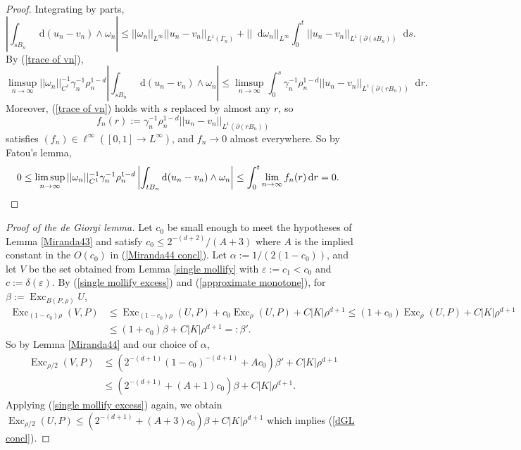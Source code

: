 \documentclass[reqno,10pt]{amsart}
\DeclareMathOperator{\Exc}{Exc}
\newcommand*\dif{\mathop{}\!\mathrm{d}}
\theoremstyle{definition}
\numberwithin{equation}{section}
\begin{document}
\begin{proof}
Integrating by parts,
$$\left|\int_{sB_n} \dif (u_n - v_n) \wedge \omega_n\right| \leq ||\omega_n||_{L^\infty} ||u_n - v_n||_{L^1(\Gamma_n)} + ||\dif \omega_n||_{L^\infty} \int_0^t ||u_n - v_n||_{L^1(\partial(sB_n))} \dif s.$$
By (\ref{trace of vn}),
$$\limsup_{n \to \infty} ||\omega_n||_{C^1}^{-1} \gamma_n^{-1} \rho_n^{1 - d} \left|\int_{sB_n} \dif(u_n - v_n) \wedge \omega_n\right| \leq \limsup_{n \to \infty} \int_0^s \gamma_n^{-1} \rho_n^{1 - d} ||u_n - v_n||_{L^1(\partial(rB_n))} \dif r.$$
Moreover, (\ref{trace of vn}) holds with $s$ replaced by almost any $r$, so
$$f_n(r) := \gamma_n^{-1} \rho_n^{1 - d} ||u_n - v_n||_{L^1(\partial(rB_n))}$$
satisfies $(f_n) \in \ell^\infty([0, 1] \to L^\infty)$, and $f_n \to 0$ almost everywhere.
So by Fatou's lemma,
\begin{align*}
0 \leq \limsup_{n \to \infty} ||\omega_n||_{C^1}^{-1} \gamma_n^{-1} \rho_n^{1 - d} \left|\int_{tB_n} \dif(u_n - v_n) \wedge \omega_n\right| &\leq \int_0^t \lim_{n \to \infty} f_n(r) \dif r = 0. \qedhere
\end{align*}
\end{proof}

\begin{proof}[Proof of the de Giorgi lemma]
Let $c_0$ be small enough to meet the hypotheses of Lemma \ref{Miranda43} and satisfy $c_0 \leq 2^{-(d + 2)}/(A + 3)$ where $A$ is the implied constant in the $O(c_0)$ in (\ref{Miranda44 concl}).
Let $\alpha := 1/(2(1 - c_0))$, and let $V$ be the set obtained from Lemma \ref{single mollify} with $\varepsilon := c_1 < c_0$ and $c := \delta(\varepsilon)$.
By (\ref{single mollify excess}) and (\ref{approximate monotone}), for $\beta := \Exc_{B(P, \rho)} U$,
\begin{align*}
\Exc_{(1 - c_0) \rho} (V, P) &\leq \Exc_{(1 - c_0) \rho} (U, P) + c_0 \Exc_\rho (U, P) + C|K| \rho^{d + 1} \leq (1 + c_0) \Exc_\rho (U, P) + C |K| \rho^{d + 1} \\
&\leq (1 + c_0) \beta + C |K| \rho^{d + 1} =: \beta'.
\end{align*}
So by Lemma \ref{Miranda44} and our choice of $\alpha$,
\begin{align*}
\Exc_{\rho/2} (V, P) &\leq (2^{-(d + 1)} (1 - c_0)^{-(d + 1)} + Ac_0) \beta' + C |K| \rho^{d + 1} \\
&\leq (2^{-(d + 1)} + (A + 1) c_0) \beta + C |K| \rho^{d + 1}.
\end{align*}
Applying (\ref{single mollify excess}) again, we obtain $\Exc_{\rho/2} (U, P) \leq (2^{-(d + 1)} + (A + 3) c_0) \beta + C |K| \rho^{d +1}$ which implies (\ref{dGL concl}).
\end{proof}
\end{document}
